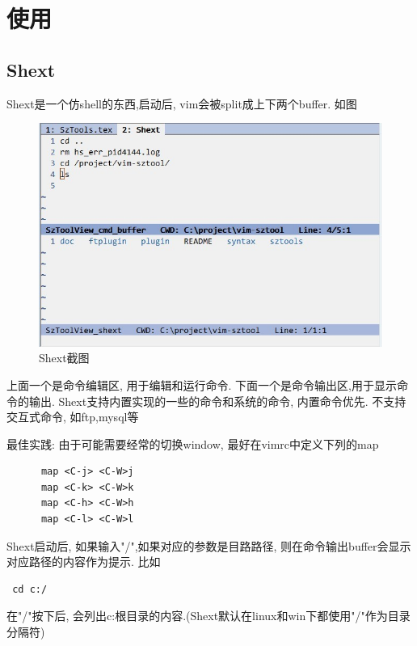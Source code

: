\documentclass[oneside,openany]{book}
\begin{document}
\chapter{使用}
  \section{Shext}
  Shext是一个仿shell的东西,启动后, vim会被split成上下两个buffer. 如图
  \begin{figure}[H]%
  \centering
  \includegraphics[bb=0 0 517 337,scale=.8]{shext.jpg}
  \caption{Shext截图}
  \end{figure}
  

  上面一个是命令编辑区, 用于编辑和运行命令. 下面一个是命令输出区,用于显示命令的输出.
  \newline
  Shext支持内置实现的一些的命令和系统的命令, 内置命令优先.
  \newline
  不支持交互式命令, 如ftp,mysql等 
  \newline
  \begin{mdframed}[style=BestPracticeFrame]
  最佳实践: 由于可能需要经常的切换window, 最好在vimrc中定义下列的map
    \begin{verbatim}
      map <C-j> <C-W>j
      map <C-k> <C-W>k
      map <C-h> <C-W>h
      map <C-l> <C-W>l
    \end{verbatim}
  \end{mdframed}

  Shext启动后, 如果输入"/",如果对应的参数是目路路径, 则在命令输出buffer会显示
对应路径的内容作为提示. 比如 
  \begin{verbatim} cd c:/ \end{verbatim}
 在"/"按下后, 会列出c:根目录的内容.(Shext默认在linux和win下都使用"/"作为目录分隔符)
\end{document}
